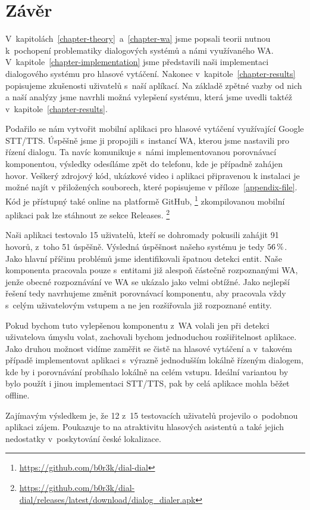\chapter*{Závěr}

V~kapitolách~\ref{chapter-theory}~a~\ref{chapter-wa} jsme popsali teorii nutnou
k~pochopení problematiky dialogových systémů a námi využívaného WA.
V~kapitole~\ref{chapter-implementation} jsme představili naši
implementaci dialogového systému pro hlasové vytáčení.
Nakonec v~kapitole~\ref{chapter-results} popisujeme zkušenosti
uživatelů s~naší aplíkací. Na základě zpětné vazby od nich a naší analýzy jsme navrhli možná
vylepšení systému, která jsme uvedli taktéž v~kapitole~\ref{chapter-results}.

Podařilo se nám vytvořit mobilní aplikaci pro hlasové vytáčení využívající
Google STT/TTS. Úspěšně jsme ji propojili
s~instancí WA, kterou jsme nastavili pro řízení dialogu. Ta navíc komunikuje s~námi
implementovanou porovnávací komponentou, výsledky odesíláme zpět do telefonu,
kde je případně zahájen hovor. Veškerý zdrojový kód, ukázkové video i aplikaci
připravenou k instalaci
je možné najít v přiložených souborech, které popisujeme v příloze~\ref{appendix-file}.
Kód je přístupný také online na platformě GitHub,%
\footnote{\url{https://github.com/b0r3k/dial-dial}}
zkompilovanou mobilní aplikaci pak lze stáhnout ze sekce Releases.%
\footnote{\url{https://github.com/b0r3k/dial-dial/releases/latest/download/dialog_dialer.apk}}

Naši aplikaci testovalo 15 uživatelů, kteří se dohromady pokusili zahájit 91 hovorů,
z~toho 51 úspěšně. Výsledná úspěšnost našeho systému je tedy \(56\,\rm \%\).
Jako hlavní příčinu problémů jsme identifikovali špatnou detekci entit.
Naše komponenta pracovala pouze s~entitami již alespoň částečně rozpoznanými
WA, jenže obecné rozpoznávání ve WA se ukázalo jako velmi obtížné. Jako nejlepší
řešení tedy navrhujeme změnit porovnávací komponentu, aby pracovala vždy s~celým
uživatelovým vstupem a ne jen rozšiřovala již rozpoznané entity.

Pokud bychom tuto vylepšenou komponentu z~WA volali jen při detekci uživatelova
úmyslu volat, zachovali bychom jednoduchou rozšiřitelnost aplikace. Jako
druhou možnost vidíme zaměřit se čistě na hlasové vytáčení a v~takovém
případě implementovat aplikaci s~výrazně jednodušším lokálně řízeným
dialogem, kde by i porovnávání probíhalo lokálně na celém vstupu. Ideální
variantou by bylo použít i jinou implementaci STT/TTS, pak by
celá aplikace mohla běžet offline.

Zajímavým výsledkem je, že 12 z~15 testovacích uživatelů projevilo o~podobnou
aplikaci zájem. Poukazuje to na atraktivitu hlasových asistentů
a také jejich nedostatky v~poskytování české lokalizace.